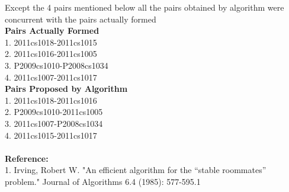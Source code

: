\documentclass[12pt]{article}
\begin{document}
Except the 4 pairs mentioned below all the pairs obtained by algorithm were concurrent with the pairs actually formed\\
\textbf{Pairs Actually Formed}\\
1. 2011cs1018-2011cs1015\\2. 2011cs1016-2011cs1005\\3. P2009cs1010-P2008cs1034\\4. 2011cs1007-2011cs1017\\
\textbf{Pairs Proposed by Algorithm}\\
1. 2011cs1018-2011cs1016\\2. P2009cs1010-2011cs1005\\3. 2011cs1007-P2008cs1034\\4. 2011cs1015-2011cs1017\\\\
\textbf{Reference:}\\
1. Irving, Robert W. "An efficient algorithm for the “stable roommates” problem." Journal of Algorithms 6.4 (1985): 577-595.1
\end{document}
